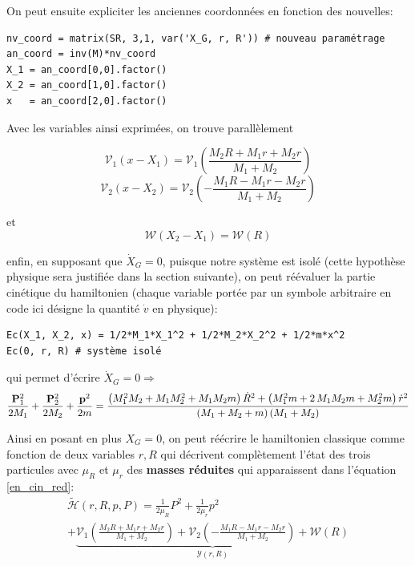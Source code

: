 \documentclass[svgnames,dvipsnames,a4paper,10pt,french]{report}
\begin{document}
On peut ensuite expliciter les anciennes coordonnées en fonction des nouvelles:
\begin{verbatim}
nv_coord = matrix(SR, 3,1, var('X_G, r, R')) # nouveau paramétrage
an_coord = inv(M)*nv_coord
X_1 = an_coord[0,0].factor()
X_2 = an_coord[1,0].factor()
x   = an_coord[2,0].factor()
\end{verbatim}

Avec les variables ainsi exprimées, on trouve parallèlement

\begin{equation}
    \mathcal{V}_1 (x-X_1) = \mathcal{V}_1\left(\frac{M_{2} R + M_{1} r + M_{2} r}{M_{1} + M_{2}} \right)
\end{equation}
\begin{equation}
    \mathcal{V}_2 (x-X_2) = \mathcal{V}_2\left(-\frac{M_{1} R - M_{1} r - M_{2} r}{M_{1} + M_{2}} \right)
\end{equation}

et
\begin{equation}
    \mathcal{W}(X_2-X_1) = \mathcal{W}(R)
\end{equation}

enfin, en supposant que $\dot{X}_G=0$, puisque notre système est isolé (cette hypothèse physique sera justifiée dans la section suivante), on peut réévaluer la partie cinétique du hamiltonien (chaque variable portée par un  symbole arbitraire  en code ici désigne la quantité $\dot{v}$ en physique):

\begin{verbatim}
Ec(X_1, X_2, x) = 1/2*M_1*X_1^2 + 1/2*M_2*X_2^2 + 1/2*m*x^2
Ec(0, r, R) # système isolé
\end{verbatim}
qui permet d'écrire $\dot{X}_G = 0 \Rightarrow$
\begin{equation}
\label{en_cin_red}
    \frac{\mathbf{P}_1^2}{2M_1} + \frac{\mathbf{P}_2^2}{2M_2} + \frac{\mathbf{p}^2}{2m} = \frac{\left(M_{1}^{2} M_{2} + M_{1} M_{2}^{2} + M_{1} M_{2} m\right) \dot{R}^{2} + \left(M_{1}^{2} m + 2 \, M_{1} M_{2} m + M_{2}^{2} m\right) \dot{r}^{2}}{\left(M_{1} + M_{2} + m\right)\left(M_{1} + M_{2}\right)}
\end{equation}

Ainsi en posant en plus $X_G=0$, on peut réécrire le hamiltonien classique comme fonction de deux variables $r,R$ qui décrivent complètement l'état des trois particules avec $\mu_R$ et $\mu_r$ des \textbf{masses réduites} qui apparaissent dans l'équation \ref{en_cin_red}:
\begin{multline}
    \tilde{\mathcal{H}}(r, R, p, P) = \frac{1}{2\mu_R} P^2 + \frac{1}{2\mu_r} p^2 \\ + \underbrace{\mathcal{V}_1\left(\frac{M_{2} R + M_{1} r + M_{2} r}{M_{1} + M_{2}} \right) + \mathcal{V}_2\left(-\frac{M_{1} R - M_{1} r - M_{2} r}{M_{1} + M_{2}} \right)  + \mathcal{W}(R)}_{\mathcal{Y}(r,R)}
\end{multline}
\end{document}
